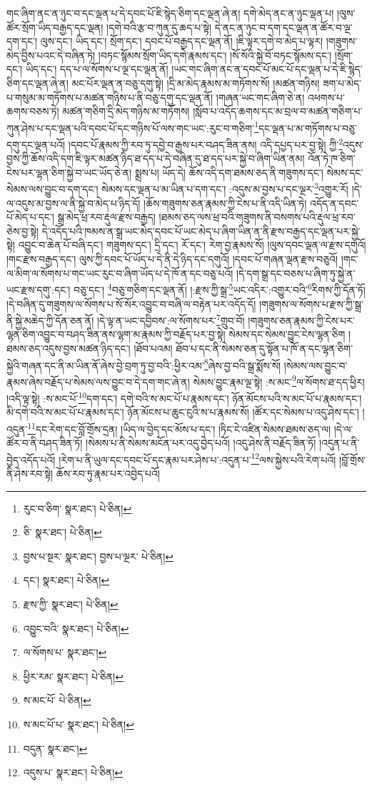 གང་ཞིག་ནང་ན་ཉུང་བ་དང་ལྡན་པ་དེ་དབང་པོ་ཇི་སྙེད་ཅིག་དང་ལྡན་ཞེ་ན། དགེ་མེད་ནང་ན་ཉུང་ལྡན་པ། །ལུས་ཚོར་སྲོག་ཡིད་བརྒྱད་དང་ལྡན། །དགེ་བའི་རྩ་བ་ཀུན་དུ་ཆད་པ་སྟེ། དེ་ནང་ན་ཉུང་བ་དག་དང་ལྡན་ན་ཚོར་བ་ལྔ་དག་དང་། ལུས་དང་། ཡིད་དང་། སྲོག་དང་། དབང་པོ་བརྒྱད་དང་ལྡན་ནོ། །ཇི་ལྟར་དགེ་བ་མེད་པ་ལྟར། །གཟུགས་མེད་བྱིས་པའང་དེ་བཞིན་ཏེ། །བཏང་སྙོམས་སྲོག་ཡིད་དགེ་རྣམས་དང་། །སོ་སོའི་སྐྱེ་བོ་བཏང་སྙོམས་དང་། །སྲོག་དང་། ཡིད་དང་། དད་པ་ལ་སོགས་པ་ལྔ་དང་ལྡན་ནོ། །ཡང་གང་ཞིག་ནང་ན་དབང་པོ་མང་པོ་དང་ལྡན་པ་དེ་ཇི་སྙེད་ཅིག་དང་ལྡན་ཞེ་ན། མང་པོར་ལྡན་ན་བཅུ་དགུ་སྟེ། །དྲི་མ་མེད་རྣམས་མ་གཏོགས་སོ། །མཚན་གཉིས། ཟག་པ་མེད་པ་གསུམ་མ་གཏོགས་པ་མཚན་གཉིས་པ་ནི་བཅུ་དགུ་དང་ལྡན་ནོ། །གཞན་ཡང་གང་ཞིག་ཅེ་ན། འཕགས་པ་ཆགས་བཅས་ཏེ། མཚན་གཅིག་དྲི་མེད་གཉིས་མ་གཏོགས། །སློབ་པ་འདོད་ཆགས་དང་མ་བྲལ་བ་མཚན་གཅིག་པ་ཀུན་ཤེས་པ་དང་ལྡན་པའི་དབང་པོ་དང་གཉིས་པོ་ལས་གང་ཡང་:རུང་བ་གཅིག་\footnote{རུང་བ་ཅིག་  སྣར་ཐང་།  པེ་ཅིན། }དང་ལྡན་པ་མ་གཏོགས་པ་བཅུ་དགུ་དང་ལྡན་པའོ། །དབང་པོ་རྣམས་ཀྱི་རབ་ཏུ་དབྱེ་བ་རྒྱས་པར་བཤད་ཟིན་ནས། འདི་དཔྱད་པར་བྱ་སྟེ། ཀྱི་\footnote{ཅི་  སྣར་ཐང་།  པེ་ཅིན། }འདུས་བྱས་ཀྱི་ཆོས་འདི་དག་ཇི་ལྟར་མཚན་ཉིད་ཐ་དད་པ་དེ་བཞིན་དུ་ཐ་དད་པར་སྐྱེ་བ་ཞིག་ཡིན་ནམ། འོན་ཏེ་ཁ་ཅིག་ངེས་པར་ལྷན་ཅིག་སྐྱེ་བ་ཡང་ཡོད་ཅེ་ན། སྨྲས་པ། ཡོད་དེ། ཆོས་འདི་དག་ཐམས་ཅད་ནི་གཟུགས་དང་། སེམས་དང་སེམས་ལས་བྱུང་བ་དག་དང་། སེམས་དང་ལྡན་པ་མ་ཡིན་པ་དག་དང་། :འདུས་མ་བྱས་པ་དང་ལྔར་\footnote{བྱས་པ་སྔར་  སྣར་ཐང་། བྱས་པ་ལྔར་  པེ་ཅིན། }འགྱུར་རོ། །དེ་ལ་འདུས་མ་བྱས་ལ་ནི་སྐྱེ་བ་མེད་པ་ཉིད་དོ། །ཆོས་གཟུགས་ཅན་རྣམས་ཀྱི་ངེས་པ་ནི་འདི་ཡིན་ཏེ། འདོད་ན་དབང་པོ་མེད་པ་དང་། སྒྲ་མེད་ཕྲ་རབ་རྡུལ་རྫས་བརྒྱད། །ཐམས་ཅད་ལས་ཕྲ་བའི་གཟུགས་ནི་བསགས་པའི་རྡུལ་ཕྲ་རབ་ཅེས་བྱ་སྟེ། དེ་འདོད་པའི་ཁམས་ན་སྒྲ་ཡང་མེད་དབང་པོ་ཡང་མེད་པ་ཞིག་ཡིན་ན་ནི་རྫས་བརྒྱད་དང་ལྡན་པར་སྐྱེ་སྟེ། འབྱུང་བ་ཆེན་པོ་བཞི་དང་། གཟུགས་དང་། དྲི་དང་། རོ་དང་། རེག་བྱ་རྣམས་སོ། །ལུས་དབང་ལྡན་ལ་རྫས་དགུའོ། །གང་རྫས་བརྒྱད་དང་། ལུས་ཀྱི་དབང་པོ་ཡོད་པ་དེ་ནི་དེ་ཉིད་དང་དགུའོ། །དབང་པོ་གཞན་ལྡན་རྫས་བཅུའོ། །གང་ལ་མིག་ལ་སོགས་པ་གང་ཡང་རུང་བ་ཞིག་ཡོད་པ་དེ་ཁོ་ན་དང་བཅུ་པའོ། །དེ་དག་སྒྲ་དང་བཅས་པ་ཞིག་ཏུ་སྐྱེ་ན་ཡང་རྫས་དགུ་:དང་། བཅུ་དང་། \footnote{དང་།    སྣར་ཐང་།  པེ་ཅིན། }བཅུ་གཅིག་དང་ལྡན་ནོ། །:རྫས་ཀྱི་སྒྲ་\footnote{རྫས་ཀྱི་  སྣར་ཐང་།  པེ་ཅིན། }ཡང་འདིར་:འགྱུར་བའི་\footnote{འབྱུང་བའི་  སྣར་ཐང་།  པེ་ཅིན། }རིགས་ཀྱི་དོན་ཏོ། །དེ་བཞིན་དུ་གཟུགས་ལ་སོགས་པ་སོ་སོར་འབྱུང་བ་བཞི་ལ་བརྟེན་པར་འདོད་དོ། །གཟུགས་ལ་སོགས་པ་རྫས་ཀྱི་སྒྲ་ནི་སྐྱེ་མཆེད་ཀྱི་དོན་ཅན་ནོ། །དེ་ལྟ་ན་ཡང་དབྱིབས་:ལ་སོགས་པར་\footnote{ལ་སོགས་པ་  སྣར་ཐང་། }གྲུབ་བོ། །གཟུགས་ཅན་རྣམས་ཀྱི་ངེས་པར་ལྷན་ཅིག་འབྱུང་བ་བཤད་ཟིན་ནས་ལྷག་མ་རྣམས་ཀྱི་བརྗོད་པར་བྱ་སྟེ། སེམས་དང་སེམས་བྱུང་ངེས་ལྷན་ཅིག །ཐམས་ཅད་འདུས་བྱས་མཚན་ཉིད་དང་། །ཐོབ་པའམ། ཐོབ་པ་དང་ནི་སེམས་ཅན་དུ་སྟོན་པ་ཁོ་ན་དང་ལྷན་ཅིག་སྐྱེའི་གཞན་དང་ནི་མ་ཡིན་ནོ་ཞེས་བྱེ་བྲག་ཏུ་བྱ་བའི་:ཕྱིར་འམ་\footnote{ཕྱིར་རམ་  སྣར་ཐང་།  པེ་ཅིན། }ཞེས་བྱ་བའི་སྒྲ་སྨོས་སོ། །སེམས་ལས་བྱུང་བ་རྣམས་ཞེས་བརྗོད་པ་སེམས་ལས་བྱུང་བ་དེ་དག་གང་ཞེ་ན། སེམས་བྱུང་རྣམ་ལྔ་སྟེ། :ས་མང་\footnote{ས་མང་པོ་  པེ་ཅིན། }ལ་སོགས་ཐ་དད་ཕྱིར། །འདི་ལྟ་སྟེ། :ས་མང་པོ་\footnote{ས་མང་པོ་པ་  སྣར་ཐང་།  པེ་ཅིན། }དག་དང་། དགེ་བའི་ས་མང་པོ་པ་རྣམས་དང་། ཉོན་མོངས་པའི་ས་མང་པོ་པ་རྣམས་དང་། མི་དགེ་བའི་ས་མང་པོ་པ་རྣམས་དང་། ཉོན་མོངས་པ་ཆུང་ངུའི་ས་པ་རྣམས་སོ། །ཚོར་དང་སེམས་པ་འདུ་ཤེས་དང་། །འདུན་\footnote{བདུན་  སྣར་ཐང་། }དང་རེག་དང་བློ་གྲོས་དྲན། །ཡིད་ལ་བྱེད་དང་མོས་པ་དང་། །ཏིང་ངེ་འཛིན་སེམས་ཐམས་ཅད་ལ། །དེ་ལ་ཚོར་བ་ནི་བཤད་ཟིན་ཏོ། །སེམས་པ་ནི་སེམས་མངོན་པར་འདུ་བྱེད་པའོ། །འདུ་ཤེས་ནི་བརྗོད་ཟིན་ཏོ། །འདུན་པ་ནི་བྱེད་འདོད་པའོ། །རེག་པ་ནི་ཡུལ་དང་དབང་པོ་དང་རྣམ་པར་ཤེས་པ་:འདུན་པ་\footnote{འདུས་པ་  སྣར་ཐང་།  པེ་ཅིན། }ལས་སྐྱེས་པའི་རེག་པའོ། །བློ་གྲོས་ནི་ཤེས་རབ་སྟེ། ཆོས་རབ་ཏུ་རྣམ་པར་འབྱེད་པའོ། 